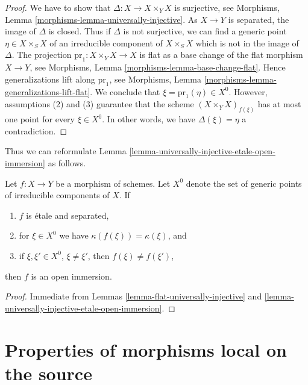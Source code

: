 \begin{proof}
We have to show that $\Delta : X \to X \times_Y X$ is surjective, see
Morphisms, Lemma \ref{morphisms-lemma-universally-injective}.
As $X \to Y$ is separated, the image of $\Delta$ is closed.
Thus if $\Delta$ is not surjective, we can find a generic point
$\eta \in X \times_S X$ of an irreducible component of $X \times_S X$
which is not in the image of $\Delta$. The projection
$\text{pr}_1 : X \times_Y X \to X$
is flat as a base change of the flat morphism $X \to Y$, see
Morphisms, Lemma \ref{morphisms-lemma-base-change-flat}.
Hence generalizations lift along $\text{pr}_1$, see
Morphisms, Lemma \ref{morphisms-lemma-generalizations-lift-flat}.
We conclude that $\xi = \text{pr}_1(\eta) \in X^0$.
However, assumptions (2) and (3) guarantee that the scheme
$(X \times_Y X)_{f(\xi)}$ has at most one point for every $\xi \in X^0$.
In other words, we have $\Delta(\xi) = \eta$ a contradiction.
\end{proof}

\noindent
Thus we can reformulate
Lemma \ref{lemma-universally-injective-etale-open-immersion} as follows.

\begin{lemma}
\label{lemma-characterize-open-immersion}
Let $f : X \to Y$ be a morphism of schemes. Let $X^0$ denote the set
of generic points of irreducible components of $X$. If
\begin{enumerate}
\item $f$ is \'etale and separated,
\item for $\xi \in X^0$ we have $\kappa(f(\xi)) = \kappa(\xi)$, and
\item if $\xi, \xi' \in X^0$, $\xi \not = \xi'$, then $f(\xi) \not = f(\xi')$,
\end{enumerate}
then $f$ is an open immersion.
\end{lemma}

\begin{proof}
Immediate from Lemmas \ref{lemma-flat-universally-injective} and
\ref{lemma-universally-injective-etale-open-immersion}.
\end{proof}
















\section{Properties of morphisms local on the source}
\label{section-properties-morphisms-local-source}

